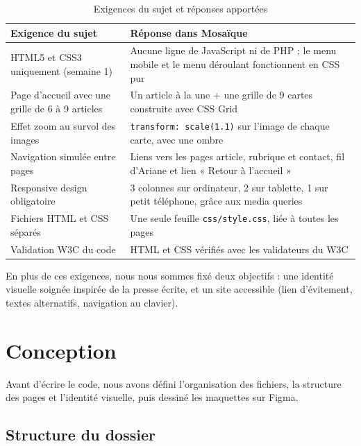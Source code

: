 \documentclass[12pt,a4paper]{article}
\newcommand{\code}[1]{\texttt{#1}}
\begin{document}
\begin{table}[H]
  \centering
  \small
  \begin{tabularx}{\textwidth}{>{\raggedright\arraybackslash}p{5cm}X}
    \toprule
    \textbf{Exigence du sujet} & \textbf{Réponse dans Mosaïque} \\
    \midrule
    HTML5 et CSS3 uniquement (semaine 1) &
      Aucune ligne de JavaScript ni de PHP ; le menu mobile et le menu
      déroulant fonctionnent en CSS pur \\
    Page d'accueil avec une grille de 6 à 9 articles &
      Un article à la une + une grille de 9 cartes construite avec CSS Grid \\
    Effet zoom au survol des images &
      \code{transform: scale(1.1)} sur l'image de chaque carte, avec une ombre \\
    Navigation simulée entre pages &
      Liens vers les pages article, rubrique et contact, fil d'Ariane et
      lien « Retour à l'accueil » \\
    Responsive design obligatoire &
      3 colonnes sur ordinateur, 2 sur tablette, 1 sur petit téléphone,
      grâce aux media queries \\
    Fichiers HTML et CSS séparés &
      Une seule feuille \code{css/style.css}, liée à toutes les pages \\
    Validation W3C du code &
      HTML et CSS vérifiés avec les validateurs du W3C \\
    \bottomrule
  \end{tabularx}
  \caption{Exigences du sujet et réponses apportées}
  \label{tab:exigences}
\end{table}

En plus de ces exigences, nous nous sommes fixé deux objectifs : une
identité visuelle soignée inspirée de la presse écrite, et un site
accessible (lien d'évitement, textes alternatifs, navigation au clavier).

\section{Conception}

Avant d'écrire le code, nous avons défini l'organisation des fichiers, la
structure des pages et l'identité visuelle, puis dessiné les maquettes sur
Figma.

\subsection{Structure du dossier}
\end{document}
